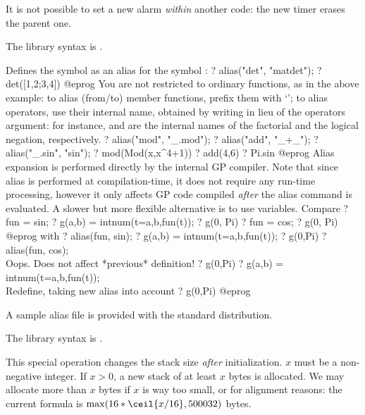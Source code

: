  It is not possible to set a new alarm \emph{within}
another  code: the new timer erases the parent one.

The library syntax is .

\label{se:alias}
Defines the symbol  as an alias for the symbol :
\bprog
? alias("det", "matdet");
? det([1,2;3,4])
@eprog\noindent
You are not restricted to ordinary functions, as in the above example:
to alias (from/to) member functions, prefix them with `';
to alias operators, use their internal name, obtained by writing
\kbd{\_} in lieu of the operators argument: for instance, \kbd{\_!} and
\kbd{!\_} are the internal names of the factorial and the
logical negation, respectively.
\bprog
? alias("mod", "_.mod");
? alias("add", "_+_");
? alias("_.sin", "sin");
? mod(Mod(x,x^4+1))
? add(4,6)
? Pi.sin
@eprog
Alias expansion is performed directly by the internal GP compiler.
Note that since alias is performed at compilation-time, it does not
require any run-time processing, however it only affects GP code
compiled \emph{after} the alias command is evaluated. A slower but more
flexible alternative is to use variables. Compare
\bprog
? fun = sin;
? g(a,b) = intnum(t=a,b,fun(t));
? g(0, Pi)
? fun = cos;
? g(0, Pi)
@eprog\noindent
with
\bprog
? alias(fun, sin);
? g(a,b) = intnum(t=a,b,fun(t));
? g(0,Pi)
? alias(fun, cos);  \\ Oops. Does not affect *previous* definition!
? g(0,Pi)
? g(a,b) = intnum(t=a,b,fun(t)); \\ Redefine, taking new alias into account
? g(0,Pi)
@eprog

A sample alias file  is provided with
the standard distribution.

The library syntax is .

\label{se:allocatemem}
This special operation changes the stack size \emph{after}
initialization. $x$ must be a non-negative integer. If $x > 0$, a new stack
of at least $x$ bytes is allocated. We may allocate more than $x$ bytes if
$x$ is way too small, or for alignment reasons: the current formula is
$\max(16*\ceil{x/16}, 500032)$ bytes.

